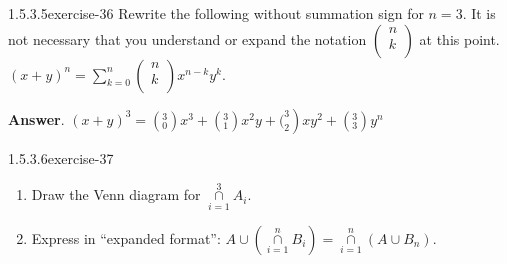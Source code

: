 \documentclass[twoside,10pt,]{book}
\numberwithin{equation}{section}
\begin{document}
\begin{divisionsolution}{1.5.3.5}{}{exercise-36}%
\hypertarget{p-530}{}%
Rewrite the following without summation sign for \(n = 3\). It is not necessary that you understand or expand the notation \(\left(
\begin{array}{c}
n \\
k \\
\end{array}
\right)\) at this point. \((x + y)^n= \sum_{k=0}^n \left(
\begin{array}{c}
n \\
k \\
\end{array}
\right)x^{n-k}y^k\).%
\par\smallskip%
\noindent\textbf{Answer}.\quad%
\hypertarget{p-531}{}%
\((x+y)^3=\left(\text{}_0^3\right)x^3+\left(\text{}_1^3\right)x^{2}y+\left.(_2^3\right)x y^2+\left(\text{}_3^3\right)y^n\)%
\end{divisionsolution}%
\begin{divisionsolution}{1.5.3.6}{}{exercise-37}%
\hypertarget{p-532}{}%
\leavevmode%
\begin{enumerate}[label=(\alph*)]
\item\hypertarget{li-379}{}\hypertarget{p-533}{}%
Draw the Venn diagram for \(\underset{i=1}{\overset{3}{\cap }}A_i\).%
\item\hypertarget{li-380}{}\hypertarget{p-534}{}%
Express in ``expanded format'': \(A\cup (\underset{i=1}{\overset{n}{\cap }}B_i)= \underset{i=1}{\overset{n}{\cap }}(A \cup B_n)\).%
\end{enumerate}
%
\end{divisionsolution}%
\end{document}
